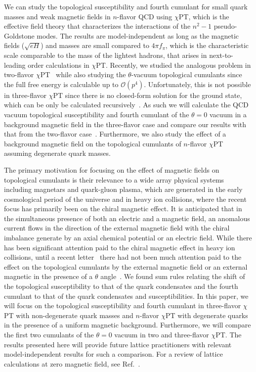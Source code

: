\documentclass[12pt]{elsarticle}
\begin{document}
We can study the topological susceptibility and fourth cumulant for small quark masses and weak magnetic fields in $n$-flavor QCD using $\chi$PT, which is the effective field theory that characterizes the interactions of the $n^{2}-1$ pseudo-Goldstone modes. The results are model-independent as long as the magnetic fields ($\sqrt{eH}$) and masses are small compared to $4\pi f_{\pi}$, which is the characteristic scale comparable to the mass of the lightest hadrons, that arises in next-to-leading order calculations in $\chi$PT. Recently, we studied the analogous problem in two-flavor $\chi$PT~\cite{Adhikari:2021xra} while also studying the $\theta$-vacuum topological cumulants since the full free energy is calculable up to $\mathcal{O}(p^{4})$. Unfortunately, this is not possible in three-flavor $\chi$PT since there is no closed-form solution for the ground state, which can be only be calculated recursively~\cite{Lu_2020}. As such we will calculate the QCD vacuum topological susceptibility and fourth cumulant of the $\theta=0$ vacuum in a background magnetic field in the three-flavor case and compare our results with that from the two-flavor case~\cite{Adhikari:2021xra}. Furthermore, we also study the effect of a background magnetic field on the topological cumulants of $n$-flavor $\chi$PT assuming degenerate quark masses.

The primary motivation for focusing on the effect of magnetic fields on topological cumulants is their relevance to a wide array physical systems including magnetars and quark-gluon plasma, which are generated in the early cosmological period of the universe and in heavy ion collisions, where the recent focus has primarily been on the chiral magnetic effect. It is anticipated that in the simultaneous presence of both an electric and a magnetic field, an anomalous current flows in the direction of the external magnetic field with the chiral imbalance generate by an axial chemical potential or an electric field. While there has been significant attention paid to the chiral magnetic effect in heavy ion collisions, until a recent letter~\cite{Adhikari:2021lbl} there had not been much attention paid to the effect on the topological cumulants by the external magnetic field or an external magnetic in the presence of a $\theta$ angle~\cite{Adhikari:2021xra}. We found sum rules relating the shift of the topological susceptibility to that of the quark condensates and the fourth cumulant to that of the quark condensates and susceptibilities. In this paper, we will focus on the topological susceptibility and fourth cumulant in three-flavor $\chi$PT with non-degenerate quark masses and $n$-flavor $\chi$PT with degenerate quarks in the presence of a uniform magnetic background. Furthermore, we will compare the first two cumulants of the $\theta=0$ vacuum in two and three-flavor $\chi$PT. The results presented here will provide future lattice practitioners with relevant model-independent results for such a comparison. For a review of lattice calculations at zero magnetic field, see Ref.~\cite{VICARI200993}. 
\end{document}
